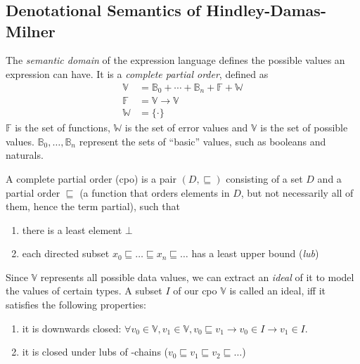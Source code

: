 \appendix
\chapter{} %

\section{Denotational Semantics of Hindley-Damas-Milner}\label{sec:denot-semant-hindl}

The \emph{semantic domain} of the expression language defines the
possible values an expression can have. It is a \emph{complete partial
  order}, defined as
\begin{align*}
  \mathbb{V} &= \mathbb{B}_0 + \cdots + \mathbb{B}_n + \mathbb{F} + \mathbb{W} \\
  \mathbb{F} &= \mathbb{V} \rightarrow \mathbb{V} \\
  \mathbb{W} &= \{ \cdot \}
\end{align*}
$\mathbb{F}$ is the set of functions, $\mathbb{W}$ is the set of error
values and $\mathbb{V}$ is the set of possible values.
$\mathbb{B}_0 , \ldots , \mathbb{B}_n$ represent the sets of
``basic'' values, such as booleans and naturals.

A complete partial order (cpo) is a pair $(D, \sqsubseteq)$ consisting of a set
$D$ and a partial order $\sqsubseteq$ (a function that orders elements in
$D$, but not necessarily all of them, hence the term partial), such
that
\begin{enumerate}
\item there is a least element $\bot$
\item each directed subset $x_0 \sqsubseteq \ldots \sqsubseteq x_n \sqsubseteq \ldots$ has a least upper bound
  (\emph{lub})
\end{enumerate}

Since $\mathbb{V}$ represents all possible data values, we
can extract an \emph{ideal} of it to model the values of certain
types. A subset $I$ of our cpo $\mathbb{V}$ is called an ideal, iff it
satisfies the following properties:
\begin{enumerate}
\item it is downwards closed: $\forall v_0 \in \mathbb{V}, v_1 \in \mathbb{V}, v_0 \sqsubseteq v_1 \rightarrow
  v_0 \in I \rightarrow v_1 \in I$.
\item it is closed under lubs of \omega-chains ($v_0 \sqsubseteq v_1 \sqsubseteq v_2 \sqsubseteq \ldots$)
\end{enumerate}

